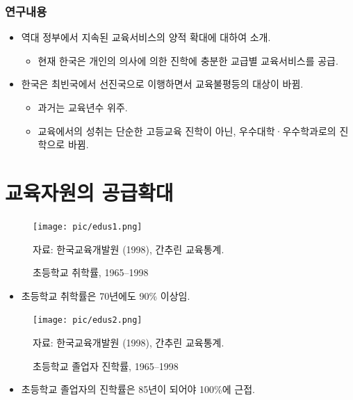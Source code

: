 \documentclass[aspectratio=169,xcolor=dvipsnames,handout]{beamer}
\begin{document}
\begin{frame}[<+->]
\frametitle{연구내용}
    \begin{itemize}
        \item 역대 정부에서 지속된 교육서비스의 양적 확대에 대하여 소개.
        \begin{itemize}[<+->]
            \item 현재 한국은 개인의 의사에 의한 진학에 충분한 교급별 교육서비스를 공급.
        \end{itemize}
        \item 한국은 최빈국에서 선진국으로 이행하면서 교육불평등의 대상이 바뀜.
        \begin{itemize}[<+->]
            \item 과거는 교육년수 위주.
            \item 교육에서의 성취는 단순한 고등교육 진학이 아닌, 우수대학·우수학과로의 진학으로 바뀜.
        \end{itemize}
    \end{itemize}
\end{frame}

\section{교육자원의 공급확대}
\begin{frame}[<+->]
    \begin{figure}
        \centering
        \texttt{[image: pic/edus1.png]}
        \\
        \raggedright%
        \hspace{1.5em}
        \tiny{자료: 한국교육개발원 (1998), 간추린 교육통계.}
        \caption{초등학교 취학률, 1965--1998}
    \end{figure}
    \begin{itemize}
        \item 초등학교 취학률은 70년에도 90\% 이상임.
    \end{itemize}
\end{frame}

\begin{frame}[<+->]
    \begin{figure}
        \centering
        \texttt{[image: pic/edus2.png]}
        \\
        \raggedright%
        \hspace{1.5em}
        \tiny{자료: 한국교육개발원 (1998), 간추린 교육통계.}
        \caption{초등학교 졸업자 진학률, 1965--1998}
    \end{figure}
    \begin{itemize}
        \item 초등학교 졸업자의 진학률은 85년이 되어야 100\%에 근접.
    \end{itemize}
\end{frame}
\end{document}
